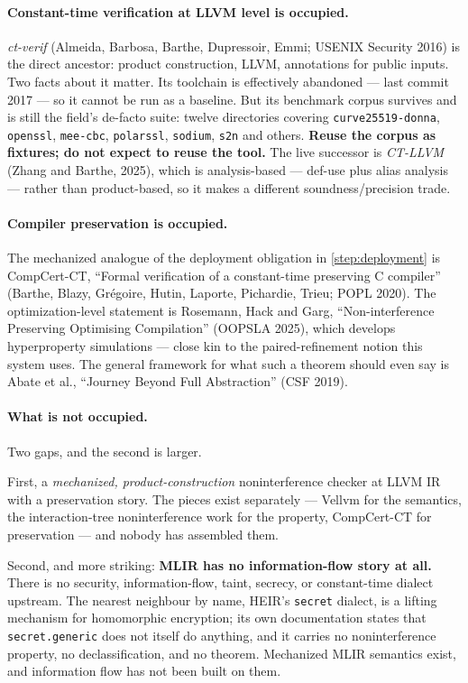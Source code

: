 \paragraph{Constant-time verification at LLVM level is occupied.} \emph{ct-verif}
(Almeida, Barbosa, Barthe, Dupressoir, Emmi; USENIX Security 2016) is the direct
ancestor: product construction, LLVM, annotations for public inputs. Two facts
about it matter. Its toolchain is effectively abandoned --- last commit 2017 ---
so it cannot be run as a baseline. But its benchmark corpus survives and is still
the field's de-facto suite: twelve directories covering \texttt{curve25519-donna},
\texttt{openssl}, \texttt{mee-cbc}, \texttt{polarssl}, \texttt{sodium},
\texttt{s2n} and others. \textbf{Reuse the corpus as fixtures; do not expect to
reuse the tool.} The live successor is \emph{CT-LLVM} (Zhang and Barthe, 2025),
which is analysis-based --- def-use plus alias analysis --- rather than
product-based, so it makes a different soundness/precision trade.

\paragraph{Compiler preservation is occupied.} The mechanized analogue of the
deployment obligation in \cref{step:deployment} is CompCert-CT, ``Formal
verification of a constant-time preserving C compiler'' (Barthe, Blazy,
Grégoire, Hutin, Laporte, Pichardie, Trieu; POPL 2020). The optimization-level
statement is Rosemann, Hack and Garg, ``Non-interference Preserving Optimising
Compilation'' (OOPSLA 2025), which develops hyperproperty simulations --- close
kin to the paired-refinement notion this system uses. The general framework for
what such a theorem should even say is Abate et al., ``Journey Beyond Full
Abstraction'' (CSF 2019).

\paragraph{What is not occupied.} Two gaps, and the second is larger.

First, a \emph{mechanized, product-construction} noninterference checker at LLVM
IR with a preservation story. The pieces exist separately --- Vellvm for the
semantics, the interaction-tree noninterference work for the property, CompCert-CT
for preservation --- and nobody has assembled them.

Second, and more striking: \textbf{MLIR has no information-flow story at all.}
There is no security, information-flow, taint, secrecy, or constant-time dialect
upstream. The nearest neighbour by name, HEIR's \texttt{secret} dialect, is a
lifting mechanism for homomorphic encryption; its own documentation states that
\texttt{secret.generic} does not itself do anything, and it carries no
noninterference property, no declassification, and no theorem. Mechanized MLIR
semantics exist, and information flow has not been built on them.

